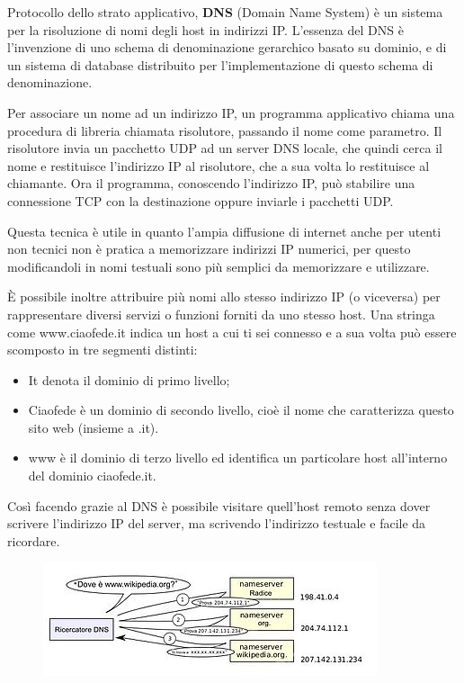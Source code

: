 Protocollo dello strato applicativo, \textbf{DNS} (Domain Name System) è un sistema per la risoluzione di nomi degli host in indirizzi IP. 
L’essenza del DNS è l’invenzione di uno schema di denominazione gerarchico basato su dominio, e di un sistema di database distribuito per l’implementazione di questo schema di denominazione.

Per associare un nome ad un indirizzo IP, un programma applicativo chiama una procedura di libreria chiamata risolutore, passando il nome come parametro. Il risolutore invia un pacchetto UDP ad un server DNS locale, che quindi cerca il nome e restituisce l’indirizzo IP al risolutore, che a sua volta lo restituisce al chiamante. Ora il programma, conoscendo l’indirizzo IP, può stabilire una connessione TCP con la destinazione oppure inviarle i pacchetti UDP.

Questa tecnica è utile in quanto l’ampia diffusione di internet anche per utenti non tecnici non è pratica a memorizzare indirizzi IP numerici, per questo modificandoli in nomi testuali sono più semplici da memorizzare e utilizzare.

È possibile inoltre attribuire più nomi allo stesso indirizzo IP (o viceversa) per rappresentare diversi servizi o funzioni forniti da uno stesso host.
Una stringa come www.ciaofede.it indica un host a cui ti sei connesso e a sua volta può essere scomposto in tre segmenti distinti:
\begin{itemize}
\item	It denota il dominio di primo livello;
\item	Ciaofede è un dominio di secondo livello, cioè il nome che caratterizza questo sito web (insieme a .it).
\item	www è il dominio di terzo livello ed identifica un particolare host all’interno del dominio ciaofede.it.
\end{itemize}
Così facendo grazie al DNS è possibile visitare quell’host remoto senza dover scrivere l’indirizzo IP del server, ma scrivendo l’indirizzo testuale e facile da ricordare.

\begin{figure}[H]
\centering
\includegraphics[scale=1]{res/img/50_DNS.png}
\end{figure}
